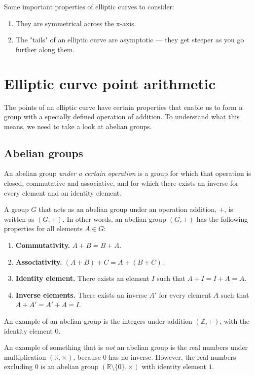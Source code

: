\documentclass[a4paper]{article}
\begin{document}
Some important properties of elliptic curves to consider:
\begin{enumerate}
    \item They are symmetrical across the x-axis.
    \item The "tails" of an elliptic curve are asymptotic --- they get steeper as you go further along them.
\end{enumerate}


\section{Elliptic curve point arithmetic}

The points of an elliptic curve have certain properties that enable us to form a group with a specially defined operation of addition. To understand what this means, we need to take a look at abelian groups.

\subsection{Abelian groups}

An abelian group \textit{under a certain operation} is a group for which that operation is closed, commutative and associative, and for which there exists an inverse for every element and an identity element.\cite[p. 11]{wp}

A group $G$ that acts as an abelian group under an operation addition, $+$, is written as $(G, +)$. In other words, an abelian group $(G, +)$ has the following properties for all elements $A \in G$:
\begin{enumerate}
    \item \textbf{Commutativity.} $A + B = B + A$.
    \item \textbf{Associativity.} $(A + B) + C = A + (B + C)$.
    \item \textbf{Identity element.} There exists an element $I$ such that $A + I = I + A = A$.
    \item \textbf{Inverse elements.} There exists an inverse $A'$ for every element $A$ such that $A + A' = A' + A = I$.\cite[p. 11]{guide}
\end{enumerate}

An example of an abelian group is the integers under addition $(\mathbb{Z}, +)$, with the identity element $0$. 

An example of something that is \textit{not} an abelian group is the real numbers under multiplication $(\mathbb{R}, \times)$, because $0$ has no inverse. However, the real numbers excluding $0$ is an abelian group $(\mathbb{R} \setminus \{0\}, \times)$ with identity element $1$.
\end{document}
